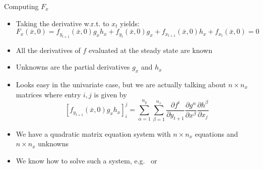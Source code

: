 \begin{frame}{Computing  $F_x$}
  \begin{itemize}
    \item Taking the derivative w.r.t. to $x_t$ yields:
          \begin{equation}
            {F_x}\left( {\bar x,0} \right) = {f_{{y_{t + 1}}}}\left( {\bar x,0} \right){g_x}{h_x} + {f_{{y_t}}}\left( {\bar x,0} \right){g_x} + {f_{{x_{t + 1}}}}\left( {\bar x,0} \right){h_x} + {f_{x_t}}\left( {\bar x,0} \right)=0
          \end{equation}
    \item All the derivatives of $f$ evaluated at the steady state are known
    \item Unknowns are the partial derivatives $g_x$ and $h_x$
    \item Looks easy in the univariate case, but we are actually talking about $n\times n_x$ matrices where entry $i,j$ is given by
          \begin{equation}
            \left[ {{f_{{y_{t + 1}}}}\left( {\bar x,0} \right){g_x}{h_x}} \right]_i^j = \sum\limits_{\alpha  = 1}^{{n_y}} {\sum\limits_{\beta  = 1}^{{n_x}} {\frac{{\partial {f^i}}}{{\partial {y_{t + 1}}}}\frac{{\partial {g^\alpha }}}{{\partial {x^\beta }}}\frac{{\partial {h^\beta }}}{{\partial {x_j}}}} }
          \end{equation}
    \item We have a quadratic matrix equation system with $n\times n_x$ equations and $n\times n_x$ unknowns
    \item We know how to solve such a system, e.g.\ \textcite{BlanchardKahn1980} or \textcite{Klein2000}
  \end{itemize}
\end{frame}

